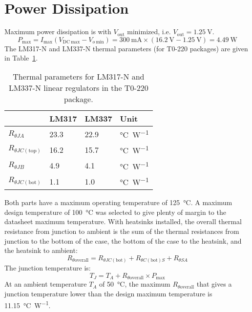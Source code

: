 \documentclass{article}
\begin{document}
\section{Power Dissipation}
Maximum power dissipation is with $V_\mathrm{out}$ minimized, i.e.
$V_\mathrm{out} = \SI{1.25}{\volt}$.
%
\begin{displaymath}
  P_\mathrm{max} = I_\mathrm{max} (V_{\mathrm{DC~max}} - V_{o~\mathrm{min}}) = 
  \SI{300}{\milli\ampere} \times (\SI{16.2}{\volt} - \SI{1.25}{\volt}) =
  \SI{4.49}{\watt}
\end{displaymath}
%
The LM317-N and LM337-N thermal parameters (for T0-220 packages) are given in 
Table~\ref{tab:thermal}.
%
\begin{table}
    \centering
    \begin{tabular}{llll}
        \toprule
        & LM317 & LM337 & Unit \\
        \midrule
        $R_{\theta JA}$               & 23.3 & 22.9 & \si{\celsius\per\watt} \\
        $R_{\theta JC\mathrm{(top)}}$ & 16.2 & 15.7 & \si{\celsius\per\watt} \\
        $R_{\theta JB}$               & 4.9  & 4.1  & \si{\celsius\per\watt} \\
        $R_{\theta JC\mathrm{(bot)}}$ & 1.1  & 1.0  & \si{\celsius\per\watt} \\
        \bottomrule
    \end{tabular}
    \caption{Thermal parameters for LM317-N and LM337-N linear regulators in
        the T0-220 package.}
    \label{tab:thermal}
\end{table}
%
Both parts have a maximum operating temperature of \SI{125}{\celsius}. A maximum
design temperature of \SI{100}{\celsius} was selected to give plenty of margin to
the datasheet maximum temperature. With heatsinks installed, the overall thermal
resistance from junction to ambient is the sum of the thermal resistances from
junction to the bottom of the case, the bottom of the case to the heatsink, and
the heatsink to ambient:
%
\begin{displaymath}
    R_{\theta\mathrm{overall}} = 
    R_{\theta JC\mathrm{(bot)}} + R_{\theta C\mathrm{(bot)}S} + R_{\theta SA}
\end{displaymath}
%
The junction temperature is:
%
\begin{displaymath}
    T_J = T_A + R_{\theta\mathrm{overall}} \times P_\mathrm{max}
\end{displaymath}
%
At an ambient temperature $T_A$ of \SI{50}{\celsius}, the maximum
$R_{\theta\mathrm{overall}}$ that gives a junction temperature lower than the
design maximum temperature is \SI{11.15}{\celsius\per\watt}.
\end{document}
